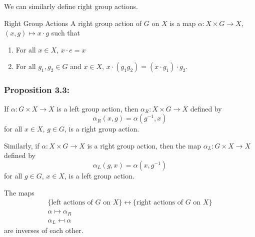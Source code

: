 \documentclass{article}
\begin{document}
We can similarly define right group actions.
\begin{definition}{Right Group Actions}
    A right group action of $G$ on $X$ is a map $\alpha: X \times G \rightarrow X$, $(x,g)\mapsto x\cdot g$ such that
    \begin{enumerate}
        \item For all $x\in X$, $x\cdot e=x$
        \item For all $g_1,g_2\in G$ and $x\in X$, $x\cdot (g_1g_2) = (x\cdot g_1)\cdot g_2$.
    \end{enumerate}
\end{definition}
\subsubsection{Proposition 3.3:}
\begin{idea}
    If $\alpha: G\times X\rightarrow X$ is a left group action, then $\alpha_R: X\times G \rightarrow X$ defined by
    \begin{equation*}
        \alpha_R(x,g)=\alpha(g^{-1},x)
    \end{equation*}
    for all $x\in X$, $g\in G$, is a right group action.
    \vspace{2mm}

    Similarly, if $\alpha: X\times G\rightarrow X$ is a right group action, then the map $\alpha_L : G\times X\rightarrow X$ defined by
    \begin{equation*}
        \alpha_L(g,x)=\alpha(x,g^{-1})
    \end{equation*}
    for all $g\in G$, $x\in X$, is a left group action.
    \vspace{2mm}

    The maps
    \begin{align*}
        \{\text{left actions of $G$ on $X$}\} \leftrightarrow \{\text{right actions of $G$ on $X$}\} \\
        \alpha \mapsto \alpha_R                                                                      \\
        \alpha_L \mapsfrom \alpha
    \end{align*}
    are inverses of each other.
\end{idea}
\end{document}
